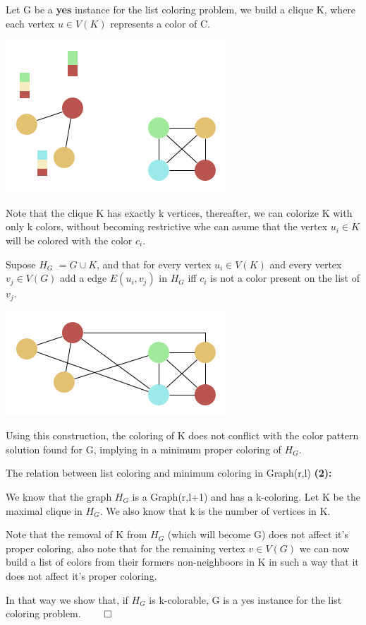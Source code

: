 \documentclass[9pt, compress]{beamer}
\begin{document}
    \begin{frame}
      Let G be a \textbf{yes} instance for the list coloring problem, we build a clique K, where each vertex $u \in V(K)$ represents a color of C.
      \begin{center}
        \includegraphics[scale=0.4]{../figuras/presentation-K.png}
      \end{center}
      Note that the clique K has exactly k vertices, thereafter, we can colorize K with only k colors, without becoming restrictive whe can asume that the vertex $u_i \in K$ will be colored with the color $c_i$.
    \end{frame}
    \begin{frame}  
      Supose $H_G$ $= G \cup K$, and that for every vertex $u_i \in V(K)$ and every vertex $v_j \in V(G)$ add a edge $E(u_i,v_j) $ in $H_G$ iff $c_i$ is not a color present on the list of $v_j$.
      \begin{center}
        \includegraphics[scale=0.4]{../figuras/presentation-H.png}
      \end{center}   
      Using this construction, the coloring of K does not conflict with the color pattern solution found for G, implying in a minimum proper coloring of $H_G$. 
    \end{frame}
    \begin{frame}{The relation between list coloring and minimum coloring in Graph(r,l)}
      \textbf{(2):}
      
      We know that the graph $H_G$ is a Graph(r,l+1) and has a k-coloring. Let K be the maximal clique in $H_G$.
      We also know that k is the number of vertices in K.
      
      Note that the removal of K from $H_G$ (which will become G) does not affect it's proper coloring, also note that for the remaining vertex $v \in V(G)$ we can now build a list of colors from their formers non-neighboors in K in such a way that it does not affect it's proper coloring.
      
      In that way we show that, if $H_G$ is k-colorable, G is a yes instance for the list coloring problem.
      $\qed$
    \end{frame}
\end{document}

